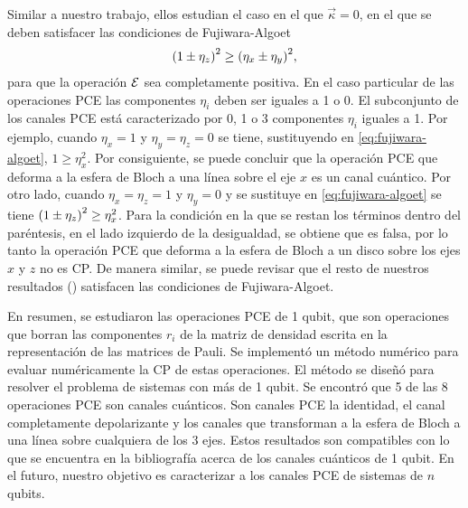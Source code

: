 Similar a nuestro trabajo, ellos estudian el caso en el que 
$\vec{\kappa}=0$, en el que se deben satisfacer 
las condiciones de Fujiwara-Algoet
\begin{align}
\qty(1\pm\eta_z)^2\geq\qty(\eta_x\pm\eta_y)^2,
\label{eq:fujiwara-algoet}
\end{align}
para que la operación $\mathcal{E}$ sea completamente positiva. En el 
caso particular de las operaciones PCE las 
componentes $\eta_i$ deben ser iguales a 1 o 0. 
El subconjunto de los canales PCE está caracterizado por
0, 1 o 3 componentes $\eta_i$ iguales a 1. Por ejemplo, 
cuando $\eta_x=1$ y $\eta_y=\eta_z=0$ se tiene,
sustituyendo en \eqref{eq:fujiwara-algoet}, $1\geq\eta_x^2$. 
Por consiguiente, se puede concluir que
la operación PCE que deforma  a la esfera de 
Bloch a una línea sobre el eje $x$ es un canal cuántico. Por otro lado, 
cuando $\eta_x=\eta_z=1$ y $\eta_y=0$ y se sustituye 
en \eqref{eq:fujiwara-algoet} se tiene $\qty(1\pm\eta_z)^2\geq\eta_x^2$. 
Para la condición en la que se restan los términos dentro 
del paréntesis, en el lado izquierdo de la desigualdad, se obtiene que
es falsa, por lo tanto la operación PCE que deforma a la esfera de 
Bloch a un disco sobre los ejes $x$ y $z$ no es CP. De manera
similar, se puede revisar que el resto de nuestros
resultados () satisfacen las condiciones
de Fujiwara-Algoet.

En resumen, se estudiaron las operaciones PCE de 1 qubit, que son operaciones 
que borran las componentes $r_i$ de la matriz de densidad 
escrita en la representación de las matrices de Pauli. 
Se implementó un método numérico para evaluar
numéricamente la CP de estas operaciones. 
El método se diseñó para resolver el problema de sistemas con más de 1 qubit.
Se encontró que 5 de las 8 operaciones PCE son canales cuánticos.
Son canales PCE la identidad, el canal completamente depolarizante 
y los canales que transforman a la esfera de Bloch a una línea sobre 
cualquiera de los 3 ejes. Estos resultados son compatibles con lo 
que se encuentra en la bibliografía acerca de los canales cuánticos
de 1 qubit. En el futuro, nuestro objetivo es
caracterizar a los canales PCE de sistemas de $n$ qubits.



